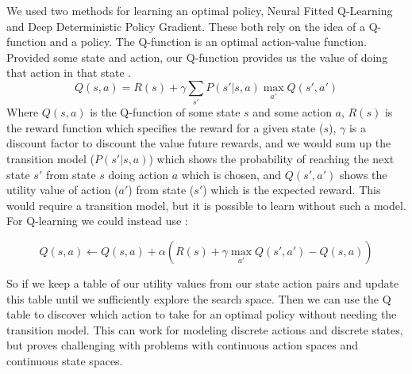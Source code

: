 \documentclass{article}
\begin{document}
We used two methods for learning an optimal policy, Neural Fitted Q-Learning and Deep Deterministic Policy Gradient. These both rely on the idea of a Q-function and a policy. The Q-function is an optimal action-value function. Provided some state and action, our Q-function provides us the value of doing that action in that state \cite{russel2010}.
\begin{equation}
    Q(s,a) = R(s) + \gamma \sum_{s'} P(s' | s,a) \max_{a'} Q(s', a')
\end{equation}
Where $Q(s,a)$ is the Q-function of some state $s$ and some action $a$, $R(s)$ is the reward function which specifies the reward for a given state ($s$), $\gamma$ is a discount factor to discount the value future rewards, and we would sum up the transition model ($P(s'|s,a)$) which shows the probability of reaching the next state $s'$ from state $s$ doing action $a$ which is chosen, and $Q(s',a')$ shows the utility value of action ($a'$) from state ($s'$) which is the expected reward. This would require a transition model, but it is possible to learn without such a model. For Q-learning we could instead use \cite{10.1007/11564096_32}:

\begin{equation}
    Q(s,a) \leftarrow Q(s,a) + \alpha(R(s) + \gamma \max_{a'} Q(s',a') - Q(s,a))
\end{equation}

So if we keep a table of our utility values from our state action pairs and update this table until we sufficiently explore the search space. Then we can use the Q table to discover which action to take for an optimal policy without needing the transition model. This can work for modeling discrete actions and discrete states, but proves challenging with problems with continuous action spaces and continuous state spaces.
\end{document}
